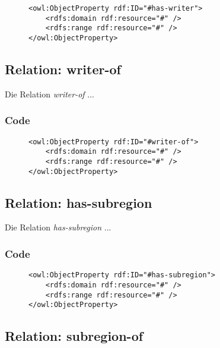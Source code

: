 \documentclass[
    11pt,
    latin1,
    a4paper,
    oneside
]{scrreprt}
\begin{document}
\begin{figure}[h]
 \lstset{language=XML}
 \begin{lstlisting}[label=owl:word]
<owl:ObjectProperty rdf:ID="#has-writer">
	<rdfs:domain rdf:resource="#" />
	<rdfs:range rdf:resource="#" />
</owl:ObjectProperty>
 \end{lstlisting}
\end{figure}


\subsection{Relation: writer-of} \label{sec:rel_writerof}

Die Relation \emph{writer-of} ...

\subsubsection{Code} \label{sec:rel_writerof_code}

\begin{figure}[h]
 \lstset{language=XML}
 \begin{lstlisting}[label=owl:word]
<owl:ObjectProperty rdf:ID="#writer-of">
	<rdfs:domain rdf:resource="#" />
	<rdfs:range rdf:resource="#" />
</owl:ObjectProperty>
 \end{lstlisting}
\end{figure}


\subsection{Relation: has-subregion} \label{sec:rel_hassubregion}

Die Relation \emph{has-subregion} ...

\subsubsection{Code} \label{sec:rel_hassubregion_code}

\begin{figure}[h]
 \lstset{language=XML}
 \begin{lstlisting}[label=owl:word]
<owl:ObjectProperty rdf:ID="#has-subregion">
	<rdfs:domain rdf:resource="#" />
	<rdfs:range rdf:resource="#" />
</owl:ObjectProperty>
 \end{lstlisting}
\end{figure}


\subsection{Relation: subregion-of} \label{sec:rel_subregionof}
\end{document}
